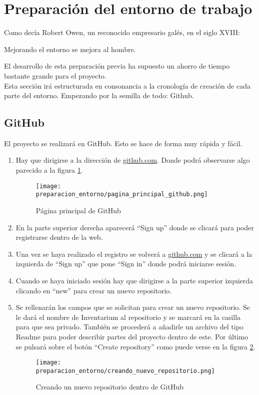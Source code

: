\section{Preparación del entorno de trabajo}

Como decía Robert Owen, un reconocido empresario galés, en el siglo XVIII:

\begin{displayquote}
    Mejorando el entorno se mejora al hombre.
\end{displayquote}

El desarrollo de esta preparación previa ha supuesto un ahorro de tiempo bastante grande para el proyecto.
\\Esta sección irá estructurada en consonancia a la cronología de creación de cada parte del entorno. Empezando por la semilla de todo: Github.

\subsection{GitHub}
El proyecto se realizará en GitHub. Esto se hace de forma muy rápida y fácil.

\begin{enumerate}
    \item Hay que dirigirse a la dirección de \url{github.com}. Donde podrá observarse algo parecido a la figura \ref{pagina_principal_github}.
          \begin{figure}[htbp]
              \centering
              \texttt{[image: preparacion\_entorno/pagina\_principal\_github.png]}
              \caption{Página principal de GitHub}\label{pagina_principal_github}
          \end{figure}
    \item En la parte superior derecha aparecerá ``Sign up'' donde se clicará para poder registrarse dentro de la web.
    \item Una vez se haya realizado el registro se volverá a \url{github.com} y se clicará a la izquierda de ``Sign up'' que pone ``Sign in'' donde podrá iniciarse sesión.
    \item Cuando se haya iniciado sesión hay que dirigirse a la parte superior izquierda clicando en ``new'' para crear un nuevo repositorio.
    \item Se rellenarán los campos que se solicitan para crear un nuevo repositorio. Se le dará el nombre de Inventarium al repositorio y se marcará en la casilla para que sea privado. También se procederá a añadirle un archivo del tipo Readme para poder describir partes del proyecto dentro de este. Por último se pulsará sobre el botón ``Create repository'' como puede verse en la figura \ref{creando_repositorio_github}.
          \begin{figure}[htbp]
              \centering
              \texttt{[image: preparacion\_entorno/creando\_nuevo\_repositorio.png]}
              \caption{Creando un nuevo repositorio dentro de GitHub}\label{creando_repositorio_github}
          \end{figure}
\end{enumerate}

